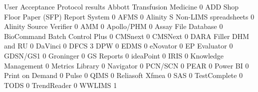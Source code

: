 \documentclass{article}
\begin{document}
\begin{Schunk}
\begin{Soutput}
                                           User Acceptance Protocol results
  Abbott Transfusion Medicine                                             0
  ADD Shop Floor Paper (SFP) Report System                                0
  AFMS                                                                    0
  Alinity S Non-LIMS spreadsheets                                         0
  Alinity Source Verifier                                                 0
  AMM                                                                     0
  Apollo/PHM                                                              0
  Assay File Database                                                     0
  BioCommand Batch Control Plus                                           0
  CMSnext                                                                 0
  CMSNext                                                                 0
  DARA Filler DHM and RU                                                  0
  DaVinci                                                                 0
  DFCS                                                                    3
  DPW                                                                     0
  EDMS                                                                    0
  eNovator                                                                0
  EP Evaluator                                                            0
  GDSN/GS1                                                                0
  Groninger                                                               0
  GS Reports                                                              0
  ideaPoint                                                               0
  IRIS                                                                    0
  Knowledge Management                                                    0
  Metrics Library                                                         0
  Navigator                                                               0
  PCN/SCN                                                                 0
  PEAR                                                                    0
  Power BI                                                                0
  Print on Demand                                                         0
  Pulse                                                                   0
  QIMS                                                                    0
  Reliasoft Xfmea                                                         0
  SAS                                                                     0
  TestComplete                                                            0
  TODS                                                                    0
  TrendReader                                                             0
  WWLIMS                                                                  1


\end{Soutput}
\end{Schunk}
\end{document}
